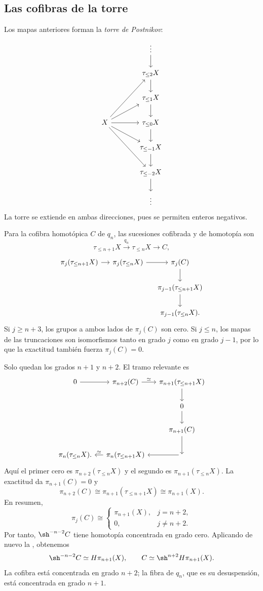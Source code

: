 \subsection{Las cofibras de la torre}
Los mapas anteriores forman la \emph{torre de Postnikov}:
\[
\begin{tikzcd}[column sep=large,row sep=normal]
&\vdots\arrow[d]\\
&\tau_{\leq2}X\arrow[d]\\
&\tau_{\leq1}X\arrow[d]\\
X\arrow[uur]\arrow[ur]\arrow[r]\arrow[dr]\arrow[ddr]&\tau_{\leq0}X\arrow[d]\\
&\tau_{\leq-1}X\arrow[d]\\
&\tau_{\leq-2}X\arrow[d]\\
&\vdots
\end{tikzcd}
\]
La torre se extiende en ambas direcciones, pues se permiten enteros negativos.

Para la cofibra homotópica $C$ de $q_n$, las sucesiones cofibrada y de homotopía son
\[
\tau_{\leq n+1}X\xrightarrow{q_n}\tau_{\leq n}X\longrightarrow C,
\]
\[
\begin{tikzcd}[column sep=small,row sep=normal]
\pi_j(\tau_{\leq n+1}X)\arrow[r]&\pi_j(\tau_{\leq n}X)\arrow[r]&\pi_j(C)\arrow[d]\\
&&\pi_{j-1}(\tau_{\leq n+1}X)\arrow[d]\\
&&\pi_{j-1}(\tau_{\leq n}X).
\end{tikzcd}
\]
Si $j\geq n+3$, los grupos a ambos lados de $\pi_j(C)$ son cero. Si $j\leq n$, los mapas de las truncaciones son isomorfismos tanto en grado $j$ como en grado $j-1$, por lo que la exactitud también fuerza $\pi_j(C)=0$.

Solo quedan los grados $n+1$ y $n+2$. El tramo relevante es
\[
\begin{tikzcd}[column sep=small,row sep=normal]
0\arrow[r]&\pi_{n+2}(C)\arrow[r,"\simeq"]&\pi_{n+1}(\tau_{\leq n+1}X)\arrow[d]\\
&&0\arrow[d]\\
&&\pi_{n+1}(C)\arrow[d]\\
\pi_n(\tau_{\leq n}X).&\pi_n(\tau_{\leq n+1}X)\arrow[l,"\simeq"']&{}
\arrow[l]
\end{tikzcd}
\]
Aquí el primer cero es $\pi_{n+2}(\tau_{\leq n}X)$ y el segundo es $\pi_{n+1}(\tau_{\leq n}X)$. La exactitud da $\pi_{n+1}(C)=0$ y
\[
\pi_{n+2}(C)\cong\pi_{n+1}(\tau_{\leq n+1}X)\cong\pi_{n+1}(X).
\]
En resumen,
\[
\pi_j(C)\cong
\begin{cases}
\pi_{n+1}(X),&j=n+2,\\
0,&j\ne n+2.
\end{cases}
\]
Por tanto, $\sh^{-n-2}C$ tiene homotopía concentrada en grado cero. Aplicando de nuevo la , obtenemos
\[
\sh^{-n-2}C\simeq H\pi_{n+1}(X),
\qquad
C\simeq\sh^{n+2}H\pi_{n+1}(X).
\]
La cofibra está concentrada en grado $n+2$; la fibra de $q_n$, que es su desuspensión, está concentrada en grado $n+1$.

